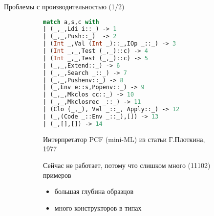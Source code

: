 \documentclass[aspectratio=169
  , xcolor={svgnames}
  , hyperref={ colorlinks,citecolor=Blue
             , linkcolor=DarkRed,urlcolor=DarkBlue}
  , russian
  ]{beamer}
\begin{document}
\begin{frame}[fragile]{Проблемы с производительностью (1/2)}
\begin{figure}
\begin{subfigure}[t]{0.5\linewidth}
\begin{lstlisting}[basicstyle=\small,language=ocaml]
match a,s,c with
| (_,_,Ldi i::_) -> 1
| (_,_,Push::_)  -> 2
| (Int _,Val (Int _)::_,IOp _::_) -> 3
| (Int _,_,Test (_,_)::c) -> 4
| (Int _,_,Test (_,_)::c) -> 5
| (_,_,Extend::_) -> 6
| (_,_,Search _::_) -> 7
| (_,_,Pushenv::_) -> 8
| (_,Env e::s,Popenv::_) -> 9
| (_,_,Mkclos cc::_) -> 10
| (_,_,Mkclosrec _::_) -> 11
| (Clo (_,_), Val _::_, Apply::_) -> 12
| (_,(Code _::Env _::_),[]) -> 13
| (_,[],[]) -> 14
\end{lstlisting}
\end{subfigure}
\hspace{1cm}
\begin{subfigure}[t]{0.35\linewidth}\vspace{0em}
Интерпретатор PCF (mini-ML) из статьи Г.Плоткина, 1977
\vspace{4em}

Сейчас не работает, потому что слишком много (11102) примеров
\begin{itemize}
\item большая глубина образцов
\item много конструкторов в типах
\end{itemize}

\end{subfigure}
\end{figure}
\end{frame}
\end{document}
